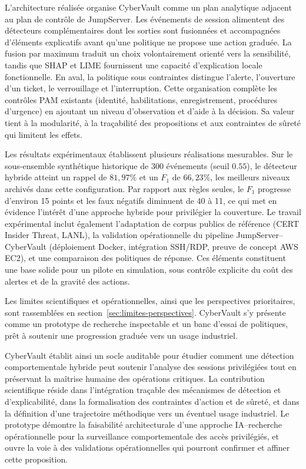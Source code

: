 \documentclass[11pt,a4paper,oneside]{report}
\theoremstyle{definition}
\theoremstyle{plain}
\begin{document}
L'architecture réalisée organise CyberVault comme un plan analytique adjacent au plan de contrôle de JumpServer. Les événements de session alimentent des détecteurs complémentaires dont les sorties sont fusionnées et accompagnées d'éléments explicatifs avant qu'une politique ne propose une action graduée. La fusion par maximum traduit un choix volontairement orienté vers la sensibilité, tandis que SHAP et LIME fournissent une capacité d'explication locale fonctionnelle. En aval, la politique sous contraintes distingue l'alerte, l'ouverture d'un ticket, le verrouillage et l'interruption. Cette organisation complète les contrôles PAM existants (identité, habilitations, enregistrement, procédures d'urgence) en ajoutant un niveau d'observation et d'aide à la décision. Sa valeur tient à la modularité, à la traçabilité des propositions et aux contraintes de sûreté qui limitent les effets.

Les résultats expérimentaux établissent plusieurs réalisations mesurables. Sur le sous-ensemble synthétique historique de 300 événements (seuil \(0.55\)), le détecteur hybride atteint un rappel de $81{,}97\%$ et un \(F_1\) de $66{,}23\%$, les meilleurs niveaux archivés dans cette configuration. Par rapport aux règles seules, le \(F_1\) progresse d'environ 15 points et les faux négatifs diminuent de 40 à 11, ce qui met en évidence l'intérêt d'une approche hybride pour privilégier la couverture. Le travail expérimental inclut également l'adaptation de corpus publics de référence (CERT Insider Threat, LANL), la validation opérationnelle du pipeline JumpServer--CyberVault (déploiement Docker, intégration SSH/RDP, preuve de concept AWS EC2), et une comparaison des politiques de réponse. Ces éléments constituent une base solide pour un pilote en simulation, sous contrôle explicite du coût des alertes et de la gravité des actions.

Les limites scientifiques et opérationnelles, ainsi que les perspectives prioritaires, sont rassemblées en section~\ref{sec:limites-perspectives}. CyberVault s'y présente comme un prototype de recherche inspectable et un banc d'essai de politiques, prêt à soutenir une progression graduée vers un usage industriel.

CyberVault établit ainsi un socle auditable pour étudier comment une détection comportementale hybride peut soutenir l'analyse des sessions privilégiées tout en préservant la maîtrise humaine des opérations critiques. La contribution scientifique réside dans l'intégration traçable des mécanismes de détection et d'explicabilité, dans la formalisation des contraintes d'action et de sûreté, et dans la définition d'une trajectoire méthodique vers un éventuel usage industriel. Le prototype démontre la faisabilité architecturale d'une approche IA--recherche opérationnelle pour la surveillance comportementale des accès privilégiés, et ouvre la voie à des validations opérationnelles qui pourront confirmer et affiner cette proposition.
\end{document}
